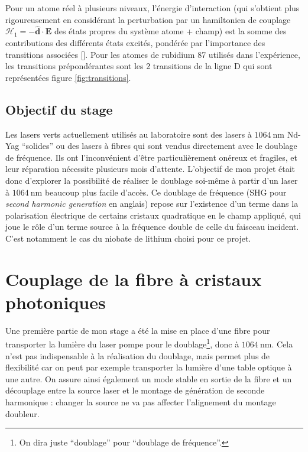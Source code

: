 \documentclass[11pt,a4paper]{article}
\newcommand{\ncite}[1]{[\citenum{#1}]}
\newcommand{\lmbd}[1]{$\SI{#1}{\nano\metre}$}
\renewcommand{\v}[1]{\boldsymbol{\mathbf{#1}}}
\begin{document}
Pour un atome réel à plusieurs niveaux, l'énergie d'interaction (qui s'obtient plus rigoureusement en considérant la perturbation par un hamiltonien de couplage $\mathcal H_1 = - \hat{\v d} \cdot \v E$ des états propres du système atome + champ) est la somme des contributions des différents états excités, pondérée par l'importance des transitions associées \ncite{grimm}. Pour les atomes de rubidium 87 utilisés dans l'expérience, les transitions prépondérantes sont les 2 transitions de la ligne D qui sont représentées figure \ref{fig:transitions}.


\subsection{Objectif du stage}

Les lasers verts actuellement utilisés au laboratoire sont des lasers à \lmbd{1064} Nd-Yag ``solides'' ou des lasers à fibres qui sont vendus directement avec le doublage de fréquence. Ils ont l'inconvénient d'être particulièrement onéreux et fragiles, et leur réparation nécessite plusieurs mois d'attente. L'objectif de mon projet était donc d'explorer la possibilité de réaliser le doublage soi-même à partir d'un laser à \lmbd{1064} beaucoup plus facile d'accès. Ce doublage de fréquence (SHG pour \textit{second harmonic generation} en anglais) repose sur l'existence d'un terme dans la polarisation électrique de certains cristaux quadratique en le champ appliqué, qui joue le rôle d'un terme source à la fréquence double de celle du faisceau incident. C'est notamment le cas du niobate de lithium choisi pour ce projet. %

\section{Couplage de la fibre à cristaux photoniques}
Une première partie de mon stage a été la mise en place d'une fibre pour transporter la lumière du laser pompe pour le doublage\footnote{On dira juste ``doublage'' pour ``doublage de fréquence''.}, donc à \lmbd{1064}. Cela n'est pas indispensable à la réalisation du doublage, mais permet plus de flexibilité car on peut par exemple transporter la lumière d'une table optique à une autre. On assure ainsi également un mode stable en sortie de la fibre et un découplage entre la source laser et le montage de génération de seconde harmonique : changer la source ne va pas affecter l'alignement du montage doubleur.
\end{document}

